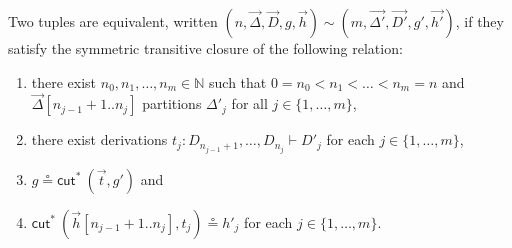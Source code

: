 \documentclass[a4paper,UKenglish,cleveref,autoref,thm-restate, anonymous]{lipics-v2021}
\renewcommand{\vec}[1]{\overrightarrow{#1}}
\newcommand{\mf}[1]{\mathsf{#1}}
\newcommand{\GD}{\Delta}
\newcommand{\vd}{\vdash}
\newcommand{\cuts}{\mf{cut}^*}
\begin{document}
\begin{definition}\label{def:equiv:intrp:triples:LPfree}
  Two tuples are equivalent, written $(n,\vec{\GD}, \vec{D} , g , \vec{h}) \sim  (m,\vec{\GD'} , \vec{D'} , g' , \vec{h'})$, if they satisfy the symmetric transitive closure of the following relation:
  \begin{enumerate}
  \item there exist $n_0,n_1,\dots,n_m \in \mathbb{N}$ such that $0 = n_0 < n_1< \dots <n_m = n$ and $\vec{\GD}[n_{j-1}+1..n_{j}]$ partitions $\GD'_j$ for all $j \in \{ 1,\dots,m \}$,
  \item there exist derivations $t_j : D_{n_{j-1}+1},\dots,D_{n_{j}} \vd D'_j$ for each $j \in \{ 1,\dots,m \}$, 
  \item $g \circeq \cuts \ (\vec{t} , g')$ and
  \item $\cuts \ (\vec{h}[n_{j-1}+1..n_j] , t_j) \circeq h'_j$ for each $j \in \{ 1,\dots,m \}$.
  \end{enumerate}
\end{definition}
\end{document}
